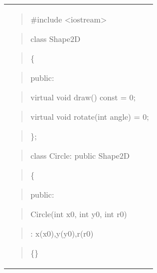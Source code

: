 \documentclass[
]{article}
\begin{document}
\begin{longtable}[]{@{}
  >{\raggedright\arraybackslash}p{}@{}}
\toprule\noalign{}
 \\
\midrule\noalign{}
\endhead
\bottomrule\noalign{}
\endlastfoot
\begin{quote}
\#include \textless iostream\textgreater{}
\end{quote}

\begin{quote}
\end{quote}

\begin{quote}
class Shape2D
\end{quote}

\begin{quote}
\{
\end{quote}

\begin{quote}
public:
\end{quote}

\begin{quote}
virtual void draw() const = 0;
\end{quote}

\begin{quote}
virtual void rotate(int angle) = 0;
\end{quote}

\begin{quote}
\};
\end{quote}

\begin{quote}
\end{quote}

\begin{quote}
class Circle: public Shape2D
\end{quote}

\begin{quote}
\{
\end{quote}

\begin{quote}
public:
\end{quote}

\begin{quote}
Circle(int x0, int y0, int r0)
\end{quote}

\begin{quote}
: x(x0),y(y0),r(r0)
\end{quote}

\begin{quote}
\{\}
\end{quote}


\end{longtable}
\end{document}
